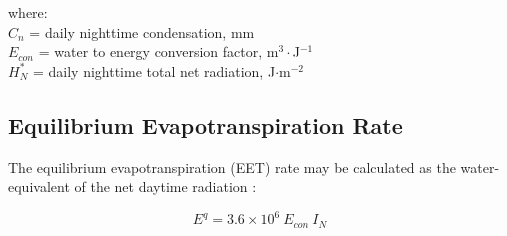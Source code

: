 \noindent where: \\
\indent $C_n$ = daily nighttime condensation, mm\\
\indent $E_{con}$ = water to energy conversion factor, m$^{3}\cdot$J$^{-1}$\\
\indent $H_N^{\ast}$ = daily nighttime total net radiation, J$\cdot$m$^{-2}$\\

\subsection{Equilibrium Evapotranspiration Rate}
\label{sec:eet}
The equilibrium evapotranspiration (EET) rate may be calculated as the water-equivalent of the net daytime radiation \parencite[Eq. 5]{prentice93}:

\begin{equation}
\label{eq:eet}
	E^q = 3.6\times 10^6\: E_{con}\: I_N
\end{equation}

